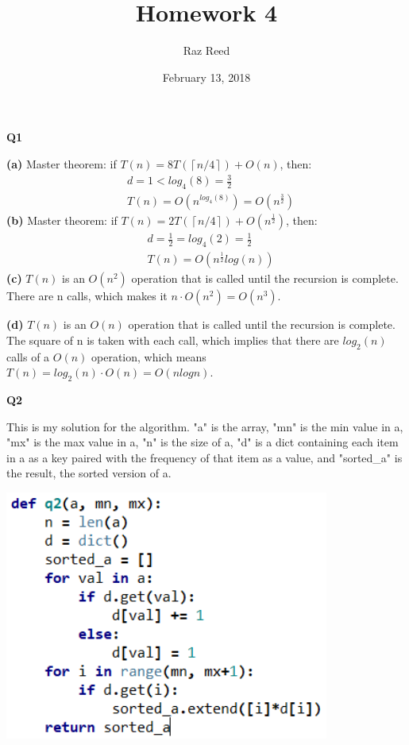 \documentclass[fleqn]{article}
\title{Homework 4}
\author{Raz Reed}
\date{February 13, 2018}
\begin{document}
\maketitle

\newpage
{\Large\bf Q1}\par
\textbf{(a)} Master theorem: if $T(n) = 8T(\left\lceil{n/4}\right\rceil) + O(n)$, then:
\begin{align*}
	&d = 1 < log_4(8) = \frac{3}{2}\\
	&T(n) = O(n^{log_4(8)}) = O(n^\frac{3}{2})
\end{align*}
\textbf{(b)} Master theorem: if $T(n) = 2T(\left\lceil{n/4}\right\rceil) + O(n^\frac{1}{2})$, then:
\begin{align*}
	&d = \frac{1}{2} = log_4(2) = \frac{1}{2}\\
	&T(n) = O(n^\frac{1}{2} log(n))
\end{align*}
\textbf{(c)} $T(n)$ is an $O(n^2)$ operation that is called until the recursion is complete. There are n calls, which makes it $n\cdot O(n^2) = O(n^3)$.\par
\textbf{(d)} $T(n)$ is an $O(n)$ operation that is called until the recursion is complete. The square of n is taken with each call, which implies that there are $log_2(n)$ calls of a $O(n)$ operation, which means $T(n) = log_2(n)\cdot O(n) = O(nlogn)$.

\newpage
{\Large\bf Q2}\par
This is my solution for the algorithm. "a" is the array, "mn" is the min value in a, "mx" is the max value in a, "n" is the size of a, "d" is a dict containing each item in a as a key paired with the frequency of that item as a value, and "sorted\_a" is the result, the sorted version of a.\par
\includegraphics[width=0.8\textwidth]{q2.png}
\end{document}
